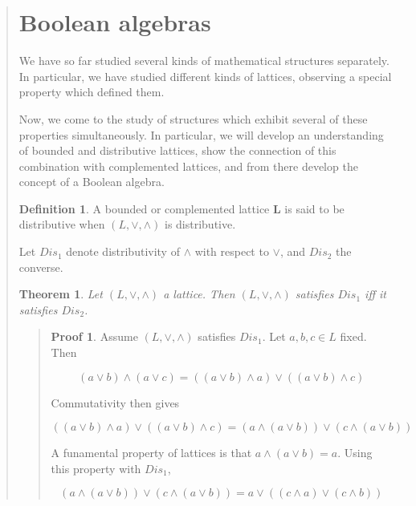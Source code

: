 \documentclass[a4paper, 12pt]{article}
\newtheorem{theorem}{Theorem}
\theoremstyle{definition}
\theoremstyle{definition}
\theoremstyle{definition}
\newtheorem{definition}{Definition}
\newtheorem{pro}{Proof}
\begin{document}
\begin{quote}
\section{Boolean algebras} 

We have so far studied several kinds of mathematical structures
separately. In particular, we have studied different kinds of lattices,
observing a special property which defined them.

Now, we come to the study of structures which exhibit several of these
properties simultaneously. In particular, we will develop an understanding of
bounded and distributive lattices, show the connection of this combination with
complemented lattices, and from there develop the concept of a Boolean algebra.

\begin{definition}
    A bounded or complemented lattice \textbf{L} is said to be distributive 
    when $(L, \lor, \land)$ is distributive.
\end{definition}

Let $Dis_1$ denote distributivity of $\land $ with respect to $\lor $,
and $Dis_2$ the converse.

\begin{theorem}
    Let $(L, \lor, \land)$ a lattice. Then $(L, \lor, \land)$ satisfies 
    $Dis_1$ iff it satisfies $Dis_2$.
\end{theorem}


\small
\begin{quote}

\begin{pro}
    Assume $(L, \lor, \land)$ satisfies $Dis_1$. Let $a, b, c \in L$ fixed. 
    Then 

    \begin{equation*}
        (a \lor  b) \land  (a \lor  c) = \left( (a \lor  b) \land  a \right)  \lor  \left( (a \lor  b) \land  c \right) 
    \end{equation*}

    Commutativity then gives 

    \begin{equation*}
         \left( (a \lor  b) \land  a \right)  \lor  \left( (a \lor  b) \land  c \right) = (a \land (a \lor b)) \lor  (c \land  (a \lor  b))
    \end{equation*}


A funamental property of lattices is that $a \land (a \lor  b) = a$. Using 
this property with $Dis_1$,

\begin{equation*}
    (a \land (a \lor b)) \lor  (c \land  (a \lor  b)) = a \lor \left( (c \land  a) \lor  (c \land  b) \right) 
\end{equation*}


\end{pro}
\end{quote}
\end{quote}
\end{document}
